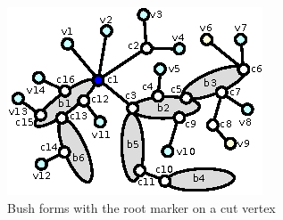 \documentclass[a4]{jgaa-art}
\begin{document}
\begin{figure}[!htb]
\begin{minipage}[b]{0.3\textwidth}
  \end{minipage}
  \hfill
  \begin{minipage}[b]{0.3\textwidth}
    \includegraphics[width=\textwidth]{marked_bush_form_03}
  \end{minipage}
  \caption{Bush forms with the root marker on a cut vertex}\label{fig:marked_bush_form_cut_vertex}
\end{figure}
\end{document}
